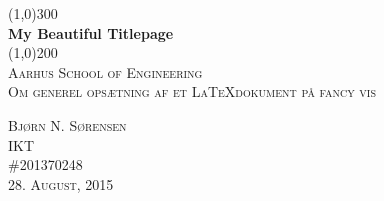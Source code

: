 
\newcommand{\myTitle}{My Beautiful Titlepage}


\begin{titlepage}
	
	\begin{center}
		\line(1,0){300} \\
		[0.5cm]
		\huge{\bfseries \myTitle} \\
		[0cm]
		\line(1,0){200} \\
		[1.5cm]
		\textsc{\LARGE Aarhus School of Engineering} \\
		[0.75cm]
		\textsc{\large Om generel opsætning af et \LaTeX dokument på fancy vis} \\
		[10cm]
	\end{center}
	
	\begin{flushright}
		\textsc{\large Bjørn N. Sørensen\\
		IKT \\
		\#201370248 \\
		28. August, 2015}
	\end{flushright}
	
\end{titlepage}
